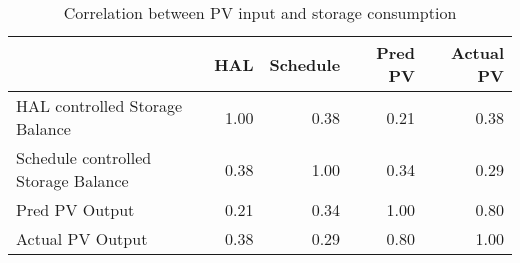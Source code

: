 \begin{table}
\centering
\caption{Correlation between PV input and storage consumption}
\label{t/res/real}
\begin{tabular}{lrrrr}
\toprule
{} &  HAL & Schedule & Pred PV & Actual PV \\
\midrule
HAL controlled Storage Balance      & 1.00 &     0.38 &    0.21 &      0.38 \\
Schedule controlled Storage Balance & 0.38 &     1.00 &    0.34 &      0.29 \\
Pred PV Output                      & 0.21 &     0.34 &    1.00 &      0.80 \\
Actual PV Output                    & 0.38 &     0.29 &    0.80 &      1.00 \\
\bottomrule
\end{tabular}
\end{table}
